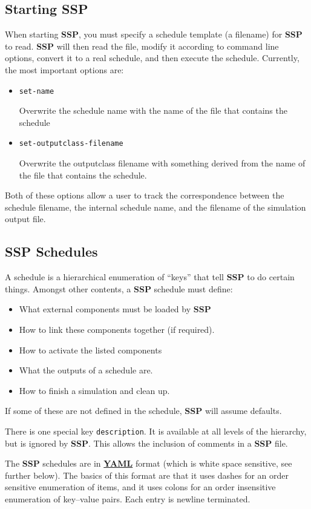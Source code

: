 \documentclass[12pt]{article}
\begin{document}
\subsection*{Starting SSP}

When starting {\bf SSP}, you must specify a schedule template (a filename) for {\bf SSP} to read. {\bf SSP} will then read the file, modify it according to command line options, convert it to a real schedule, and then execute the schedule. Currently, the most important options are:
\begin{itemize}
\item[ ]{\tt set-name}

Overwrite the schedule name with the name of the file that contains the schedule
\item[ ]{\tt set-outputclass-filename}

Overwrite the outputclass filename with something derived from the name of the file that contains the schedule.
\end{itemize}
Both of these options allow a user to track the correspondence between the schedule filename, the internal schedule name, and the filename of the simulation output file.

\subsection*{SSP Schedules}

A schedule is a hierarchical enumeration of ``keys'' that tell {\bf SSP} to do certain things. Amongst other contents, a {\bf SSP} schedule must define:
\begin{itemize}
\item What external components must be loaded by {\bf SSP}
\item How to link these components together (if required).
\item How to activate the listed components
\item What the outputs of a schedule are.
\item How to finish a simulation and clean up.
\end{itemize}
If some of these are not defined in the schedule, {\bf SSP} will assume defaults.

There is one special key {\tt description}. It is available at all levels of the hierarchy, but is ignored by {\bf SSP}. This allows the inclusion of comments in a {\bf SSP} file.

The {\bf SSP} schedules are in \href{http://fdik.org/yml/}{\bf YAML} format (which is white space sensitive, see further below). The basics of this format are that it uses dashes for an order sensitive enumeration of items, and it uses colons for an order insensitive enumeration of key--value pairs. Each entry is newline terminated.
\end{document}
